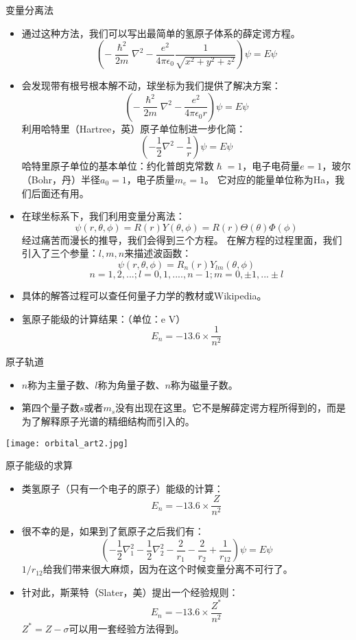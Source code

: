 \documentclass[10pt,compress,t]{ctexbeamer}
\begin{document}
\begin{frame}{变量分离法}
\begin{itemize}
  \item 通过这种方法，我们可以写出最简单的氢原子体系的薛定谔方程。
  $$ (-\frac{\hslash^2}{2m} \nabla ^2 - \frac{e^2}{4\pi \epsilon_0} \frac{1}{\sqrt{x^2+y^2+z^2}}) \psi = E \psi $$
  \item 会发现带有根号根本解不动，球坐标为我们提供了解决方案：
  $$ (-\frac{\hslash^2}{2m} \nabla ^2 - \frac{e^2}{4\pi \epsilon_0 r}) \psi = E \psi $$
  利用哈特里（Hartree，英）原子单位制进一步化简：
  $$ (-\frac{1}{2} \nabla ^2 - \frac{1}{r}) \psi = E \psi $$
  哈特里原子单位的基本单位：约化普朗克常数$\hslash=1$，电子电荷量$e=1$，玻尔（Bohr，丹）半径$a_0=1$，电子质量$m_e=1$。
  它对应的能量单位称为Ha，我们后面还有用。
\end{itemize}
\end{frame}

\begin{frame}
 \begin{itemize}
  \item 在球坐标系下，我们利用变量分离法：
  $$\psi(r,\theta,\phi) = R(r) Y(\theta, \phi) =R(r)\Theta (\theta)\Phi(\phi)$$
  经过痛苦而漫长的推导，我们会得到三个方程。
  在解方程的过程里面，我们引入了三个参量：$l,m,n$来描述波函数：
  $$\psi(r,\theta,\phi) = R_n (r) Y_{lm}(\theta, \phi)$$
  $$n = 1,2,... ; l = 0,1,....,n-1 ; m = 0, \pm 1, ... \pm l$$
  \item 具体的解答过程可以查任何量子力学的教材或Wikipedia。
  \item 氢原子能级的计算结果：（单位：e V）
  $$E_n = -13.6 × \frac{1}{n^2}$$
 \end{itemize}
\end{frame}

\begin{frame}{原子轨道}
  \begin{itemize}
    \item $n$称为主量子数、$l$称为角量子数、$n$称为磁量子数。
    \item 第四个量子数$s$或者$m_s$没有出现在这里。它不是解薛定谔方程所得到的，而是为了解释原子光谱的精细结构而引入的。
  \end{itemize}
  \centering
  \texttt{[image: orbital\_art2.jpg]}
  \end{frame}

\begin{frame}{原子能级的求算}
\begin{itemize}
  \item 类氢原子（只有一个电子的原子）能级的计算：
  $$E_n = -13.6 × \frac{Z}{n^2}$$
  \item 很不幸的是，如果到了氦原子之后我们有：
  $$ (-\frac{1}{2} \nabla_1 ^2 -\frac{1}{2} \nabla_2 ^2 - \frac{2}{r_1} - \frac{2}{r_2} + \frac{1}{r_{12}}) \psi = E \psi $$
  $1/r_{12}$给我们带来很大麻烦，因为在这个时候变量分离不可行了。
  \item 针对此，斯莱特（Slater，美）提出一个经验规则：
  $$E_n = -13.6 × \frac{Z^*}{n^2}$$
  $Z^* = Z-\sigma $可以用一套经验方法得到。
\end{itemize}
\end{frame}
\end{document}
